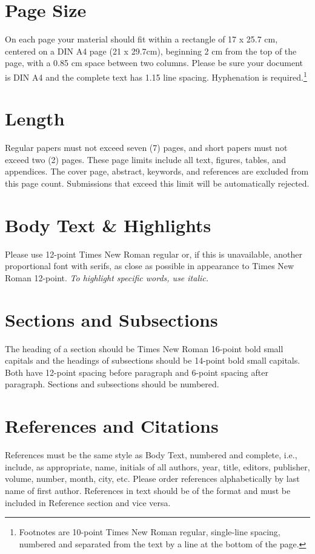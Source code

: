 \documentclass{wzbconf}
\begin{document}
\section{Page Size}

On each page your material should fit within a rectangle of 17 x 25.7 cm, centered on a DIN A4 page (21 x 29.7cm), beginning 2 cm from the top of the page, with a 0.85 cm space between two columns.  Please be sure your document is DIN A4 and the complete text has 1.15 line spacing.  Hyphenation is required.\footnote{Footnotes are 10-point Times New Roman regular, single-line spacing, numbered and separated from the text by a line at the bottom of the page.}

\section{Length}

Regular papers must not exceed seven (7) pages, and short papers must not exceed two (2) pages.  These page limits include all text, figures, tables, and appendices.  The cover page, abstract, keywords, and references are excluded from this page count.  Submissions that exceed this limit will be automatically rejected.

\section{Body Text \& Highlights}

Please use 12-point Times New Roman regular or, if this is unavailable, another proportional font with serifs, as close as possible in appearance to Times New Roman 12-point.  \textit{To highlight specific words, use italic.}

\section{Sections and Subsections}

The heading of a section should be Times New Roman 16-point bold small capitals and the headings of subsections should be 14-point bold small capitals.  Both have 12-point spacing before paragraph and 6-point spacing after paragraph.  Sections and subsections should be numbered.

\section{References and Citations}

References must be the same style as Body Text, numbered and complete, i.e., include, as appropriate, name, initials of all authors, year, title, editors, publisher, volume, number, month, city, etc.  Please order references alphabetically by last name of first author.
References in text should be of the format \parencite{Krasnova2015, Gronau2016, Wagner2018} and must be included in Reference section and vice versa.
\end{document}
